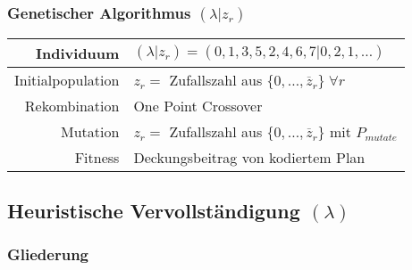 \begin{frame}
	\frametitle{Genetischer Algorithmus $(\lambda|z_{r})$}
	\begin{small}
		\begin{center}
			\begin{tabular}{rl}
				\hline 
				Individuum & $(\lambda|z_{r})=(0,1,3,5,2,4,6,7|0,2,1,\ldots)$\parbox[c][40pt][c]{0pt}{}\tabularnewline
				\hline 
				Initialpopulation & $z_{r}=$ Zufallszahl aus $\{0, \ldots, \overline{z}_{r}\} \; \forall r$\tabularnewline
				\hline 
				Rekombination & One Point Crossover\tabularnewline
				\hline 
				Mutation & $z_{r}=$ Zufallszahl aus $\{0, \ldots, \overline{z}_{r}$\} mit $P_{mutate}$\tabularnewline
				\hline 
				Fitness & Deckungsbeitrag von kodiertem Plan\tabularnewline
				\hline
			\end{tabular}
		\end{center}
	\end{small}
\end{frame}


\subsection{Heuristische Vervollständigung $(\lambda)$}
\begin{frame}[noframenumbering]
	\frametitle{Gliederung}
	\tableofcontents[currentsubsection]
\end{frame}

